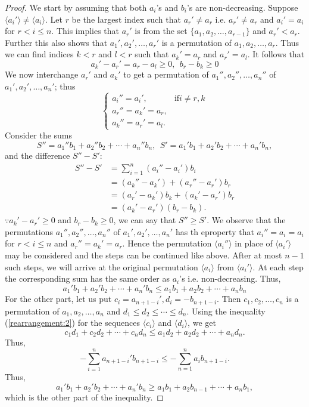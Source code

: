 \begin{proof}
  We start by assuming that both $a_i$'s and $b_i$'s are non-decreasing. Suppose $\langle a_i'\rangle\neq\langle a_i\rangle$. Let
  $r$ be the largest index such that $a_r'\neq a_r$ i.e. $a_r'\neq a_r$ and $a_i'=a_i$ for $r<i\leq n$. This implies that $a_r'$ is
  from the set $\{a_1, a_2, \ldots, a_{r - 1}\}$ and $a_r'<a_r$. Further this also shows that $a_1', a_2', \ldots, a_r'$ is a
  permutation of $a_1, a_2, \ldots, a_r$. Thus we can find indices $k<r$ and $l<r$ such that $a_k' = a_r$ and $a_r' = a_l$. It
  follows that $$a_k' - a_r' = a_r - a_l\geq 0,~~b_r - b_k\geq 0$$
  We now interchange $a_r'$ and $a_k'$ to get a permutation of $a_1'', a_2'', \ldots, a_n''$ of $a_1', a_2', \ldots, a_n'$; thus
  $$\begin{cases}a_i''=a_i', & \text{if}i\neq r, k\\a_r''=a_k'=a_r,\\a_k''=a_r'=a_l.\end{cases}$$
  Consider the sums
  $$S'' = a_1''b_1 + a_2''b_2 + \cdots + a_n''b_n, ~~S' = a_1'b_1 + a_2'b_2 + \cdots + a_n'b_n,$$
  and the difference $S'' - S':$
  $$\begin{aligned}S'' - S' & = \sum_{i=1}^n(a_i'' - a_i')b_i\\& = (a_k'' - a_k') + (a_r'' - a_r')b_r\\&=(a_r' - a_k')b_k + (a_k' -
    a_r')b_r\\& = (a_k' - a_r')(b_r - b_k).\end{aligned}$$
  $\because a_k' - a_r' \geq 0$ and $b_r - b_k \geq 0$, we can say that $S''\geq S'$. We observe that the permutations $a_1'', a_2'',
  \ldots, a_n''$ of $a_1', a_2', \ldots, a_n'$ has th eproperty that $a_i'' = a_i = a_i$ for $r< i\leq n$ and $a_r'' = a_k' =
  a_r$. Hence the permutation $\langle a_i''\rangle$ in place of $\langle a_i'\rangle$ may be considered and the steps can be
  continued like above. After at most $n - 1$ such steps, we will arrive at the original permutation $\langle a_i\rangle$ from
  $\langle a_i'\rangle$. At each step the corresponding sum has the same order as $a_i$'s i.e. non-decreasing. Thus,
  \begin{equation}
    \label{rearrangement:2}
    a_1'b_1 + a_2'b_2 + \cdots + a_n'b_n\leq a_1b_1 + a_2b_2 + \cdots + a_nb_n
  \end{equation}
  For the other part, let us put $c_i = a_{n + 1 - i}', d_i = -b_{n + 1 - i}$. Then $c_1, c_2, \ldots, c_n$ is a permutation of
  $a_1, a_2, \ldots, a_n$ and $d_1\leq d_2\leq \cdots\leq d_n$. Using the inequality (\ref{rearrangement:2}) for the sequences
  $\langle c_i\rangle$ and $\langle d_i\rangle$, we get
  $$c_1d_1 + c_2d_2 + \cdots + c_nd_n\leq a_1d_2 + a_2d_2 + \cdots + a_nd_n.$$
  Thus,
  $$-\sum_{i=1}^na_{n+1 - i}'b_{n+1-i}\leq -\sum_{n=1}^na_ib_{n+1-i}.$$
  Thus, \begin{equation}\label{rearrangement:3}a_1'b_1 + a_2'b_2 + \cdots + a_n'b_n\geq a_1b_1 + a_2b_{n - 1} + \cdots +
    a_nb_1,\end{equation}
  which is the other part of the inequality.


\end{proof}
